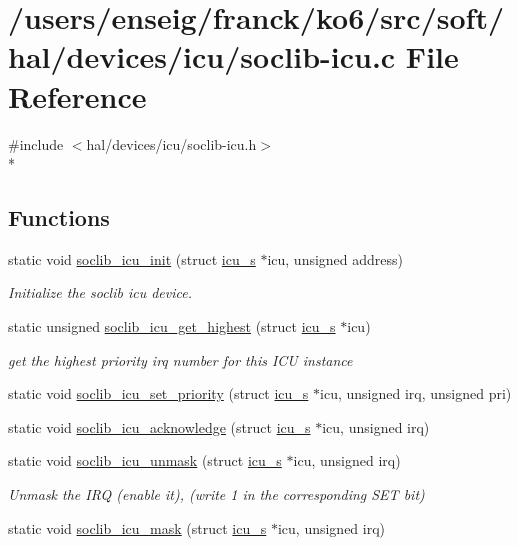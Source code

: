\hypertarget{icu_2soclib-icu_8c}{\section{/users/enseig/franck/ko6/src/soft/hal/devices/icu/soclib-\/icu.c File Reference}
\label{icu_2soclib-icu_8c}
}
{\ttfamily \#include $<$hal/devices/icu/soclib-\/icu.\-h$>$}\\*
\subsection*{Functions}
\begin{DoxyCompactItemize}
\item 
static void \hyperlink{icu_2soclib-icu_8c_a291831fe78dd1a558504a84a5685199b}{soclib\-\_\-icu\-\_\-init} (struct \hyperlink{structicu__s}{icu\-\_\-s} $\ast$icu, unsigned address)
\begin{DoxyCompactList}\small\item\em Initialize the soclib icu device. \end{DoxyCompactList}\item 
static unsigned \hyperlink{icu_2soclib-icu_8c_a31bf159c6e02e1717177273e6a74d374}{soclib\-\_\-icu\-\_\-get\-\_\-highest} (struct \hyperlink{structicu__s}{icu\-\_\-s} $\ast$icu)
\begin{DoxyCompactList}\small\item\em get the highest priority irq number for this I\-C\-U instance \end{DoxyCompactList}\item 
static void \hyperlink{icu_2soclib-icu_8c_a29d2109ae12995fb60a2a9f278281e4f}{soclib\-\_\-icu\-\_\-set\-\_\-priority} (struct \hyperlink{structicu__s}{icu\-\_\-s} $\ast$icu, unsigned irq, unsigned pri)
\item 
static void \hyperlink{icu_2soclib-icu_8c_a924a53d9cd3a4685a608fe6ec5efdca8}{soclib\-\_\-icu\-\_\-acknowledge} (struct \hyperlink{structicu__s}{icu\-\_\-s} $\ast$icu, unsigned irq)
\item 
static void \hyperlink{icu_2soclib-icu_8c_a7fcbcc6fb620f7a6ed3082b7053ce0e1}{soclib\-\_\-icu\-\_\-unmask} (struct \hyperlink{structicu__s}{icu\-\_\-s} $\ast$icu, unsigned irq)
\begin{DoxyCompactList}\small\item\em Unmask the I\-R\-Q (enable it), (write 1 in the corresponding S\-E\-T bit) \end{DoxyCompactList}\item 
static void \hyperlink{icu_2soclib-icu_8c_a97854aad88a8ec5625b03d30cc0246e4}{soclib\-\_\-icu\-\_\-mask} (struct \hyperlink{structicu__s}{icu\-\_\-s} $\ast$icu, unsigned irq)
\end{DoxyCompactItemize}
